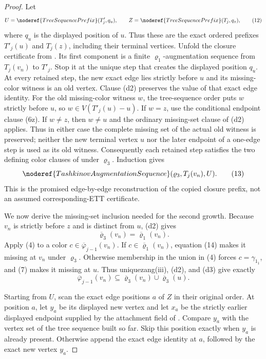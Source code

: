 \begin{proof}
Let
\[
 U=\noderef{TreeSequencePrefix}(T'_j,q_u),
 \qquad Z=\noderef{TreeSequencePrefix}(T_j,q_z),              \tag{12}
\]
where \(q_u\) is the displayed position of \(u\).  Thus these are the
exact ordered prefixes \(T'_j(u)\) and \(T_j(z)\), including their
terminal vertices.  Unfold the closure certificate from
.  Its first component is a finite
\(\varrho_1\)-augmentation sequence from \(T_j(v_n)\) to \(T'_j\).
Stop it at the unique step that creates the displayed position \(q_u\).
At every retained step, the new exact edge lies strictly before \(u\)
and its missing-color witness is an old vertex.  Clause (d2) preserves
the value of that exact edge identity.  For the old missing-color witness
\(w\), the tree-sequence order puts \(w\) strictly before \(u\), so
\(w\in V(T'_j(u)-u)\).  If \(w=z\), use the conditional endpoint clause
(6z).  If \(w\ne z\), then \(w\ne u\) and the ordinary missing-set clause
of (d2) applies.  Thus in either case the complete missing set of the
actual old witness is preserved; neither the new terminal vertex \(u\) nor
the later endpoint of a one-edge step is used as its old witness.  Consequently
each retained step satisfies the two defining color clauses of
 under \(\varrho_3\).  Induction gives
\[
 \noderef{TashkinovAugmentationSequence}
       (\varrho_3,T_j(v_n),U).                               \tag{13}
\]
This is the promised edge-by-edge reconstruction of the copied closure
prefix, not an assumed corresponding-ETT certificate.

We now derive the missing-set inclusion needed for the second growth.
Because \(v_n\) is strictly before \(z\) and is distinct from \(u\),
(d2) gives
\[
 \overline{\varrho}_3(v_n)=\overline{\varrho}_1(v_n).        \tag{14}
\]
Apply (4) to a color \(c\in\overline\varphi_{j-1}(v_n)\).
If \(c\in\overline{\varrho}_1(v_n)\), equation (14) makes it missing
at \(v_n\) under \(\varrho_3\).  Otherwise membership in the union in
(4) forces \(c=\gamma_{1_1}\), and (7) makes it missing at \(u\).
Thus uniquezang(iii), (d2), and (d3) give exactly
\[
 \overline\varphi_{j-1}(v_n)
   \subseteq
   \overline{\varrho}_3(v_n)\cup\overline{\varrho}_3(u).    \tag{15}
\]

Starting from \(U\), scan the exact edge positions \(a\) of \(Z\) in their
original order.  At position \(a\), let \(y_a\) be its displayed new vertex
and let \(x_a\) be the strictly earlier displayed endpoint supplied by the
attachment field of .  Compare \(y_a\) with the
vertex set of the tree sequence built so far.  Skip this position exactly
when \(y_a\) is already present.  Otherwise append the exact edge identity
at \(a\), followed by the exact new vertex \(y_a\).


\end{proof}
